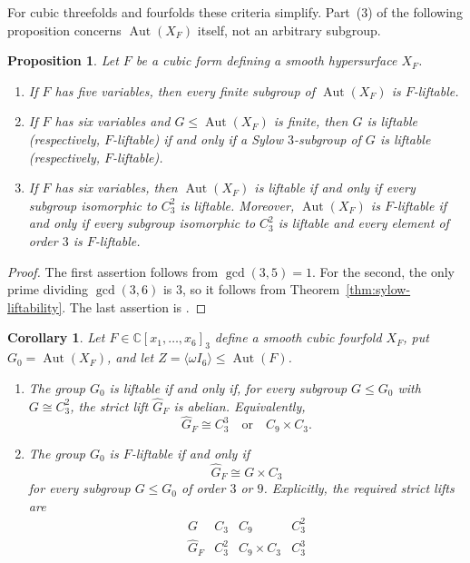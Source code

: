 \documentclass[12pt]{amsart}
\numberwithin{equation}{section}
\theoremstyle{plain}
\newtheorem{prop}[thm]{Proposition}
\newtheorem{cor}[thm]{Corollary}
\theoremstyle{definition}
\theoremstyle{remark}
\newcommand{\CC}{\mathbb C}
\DeclareMathOperator{\Aut}{Aut}
\begin{document}
For cubic threefolds and fourfolds these criteria simplify. Part~(3) of
the following proposition concerns $\Aut(X_F)$ itself, not an arbitrary
subgroup.

\begin{prop}\label{prop:cubic-liftability}
Let $F$ be a cubic form defining a smooth hypersurface $X_F$.
\begin{enumerate}
    \item If $F$ has five variables, then every finite subgroup of
    $\Aut(X_F)$ is $F$-liftable.

    \item If $F$ has six variables and $G\leq\Aut(X_F)$ is finite, then
    $G$ is liftable (respectively, $F$-liftable) if and only if a Sylow
    $3$-subgroup of $G$ is liftable (respectively, $F$-liftable).

    \item If $F$ has six variables, then $\Aut(X_F)$ is liftable if and
    only if every subgroup isomorphic to $C_3^2$ is liftable.  Moreover,
    $\Aut(X_F)$ is $F$-liftable if and only if every subgroup isomorphic
    to $C_3^2$ is liftable and every element of order $3$ is
    $F$-liftable.
\end{enumerate}
\end{prop}

\begin{proof}
The first assertion follows from
$\gcd(3,5)=1$.  For the second, the only prime dividing
$\gcd(3,6)$ is $3$, so it follows from
Theorem~\ref{thm:sylow-liftability}.  The last assertion is
\cite[Theorem~1.4]{xiezhengfull}.
\end{proof}

\begin{cor}\label{cor:small-preimage-liftability}
Let $F\in\CC[x_1,\ldots,x_6]_3$ define a smooth cubic fourfold $X_F$, put
$G_0=\Aut(X_F)$, and let
$Z=\langle\omega I_6\rangle\leq\Aut(F)$.
\begin{enumerate}
    \item The group $G_0$ is liftable if and only if, for every subgroup
    $G\leq G_0$ with $G\cong C_3^2$, the strict lift $\widehat G_F$ is abelian.
    Equivalently,
    \[
        \widehat G_F\cong C_3^3
        \quad\text{or}\quad
        C_9\times C_3.
    \]

    \item The group $G_0$ is $F$-liftable if and only if
    \[
        \widehat G_F\cong G\times C_3
    \]
    for every subgroup $G\leq G_0$ of order $3$ or $9$.  Explicitly, the
    required strict lifts are
    \[
\begin{array}{c|ccc}
G & C_3 & C_9 & C_3^2 \\ \hline
\widehat G_F & C_3^2 & C_9\times C_3 & C_3^3
\end{array}
\]
\end{enumerate}
\end{cor}
\end{document}
